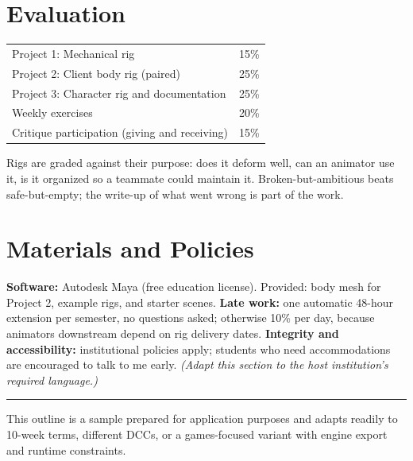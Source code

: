 \documentclass[10pt,a4paper]{article}
\begin{document}
\section{Evaluation}
\begin{tabularx}{\textwidth}{@{}Xr@{}}
Project 1: Mechanical rig & 15\% \\
Project 2: Client body rig (paired) & 25\% \\
Project 3: Character rig and documentation & 25\% \\
Weekly exercises & 20\% \\
Critique participation (giving and receiving) & 15\% \\
\end{tabularx}

Rigs are graded against their purpose: does it deform well, can an animator use it, is it organized so a teammate could maintain it. Broken-but-ambitious beats safe-but-empty; the write-up of what went wrong is part of the work.

\section{Materials and Policies}
\textbf{Software:} Autodesk Maya (free education license). Provided: body mesh for Project 2, example rigs, and starter scenes. \textbf{Late work:} one automatic 48-hour extension per semester, no questions asked; otherwise 10\% per day, because animators downstream depend on rig delivery dates. \textbf{Integrity and accessibility:} institutional policies apply; students who need accommodations are encouraged to talk to me early. \textit{(Adapt this section to the host institution's required language.)}

\vspace{8pt}
\hrule
\vspace{4pt}
{\small This outline is a sample prepared for application purposes and adapts readily to 10-week terms, different DCCs, or a games-focused variant with engine export and runtime constraints.}
\end{document}

